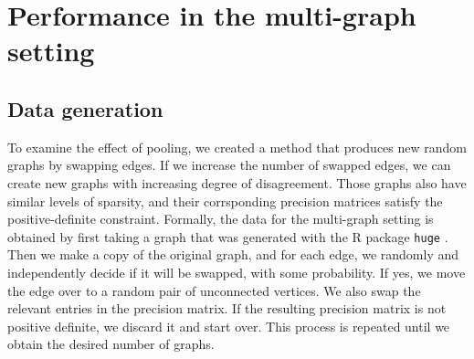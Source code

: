 \documentclass[a4paper, 11pt, oneside]{report}
\newcommand{\1}{\mathds{1}}
\begin{document}
\section{Performance in the multi-graph setting}

\subsection{Data generation}\label{ssect:data-generation}
To examine the effect of pooling, we created a method that produces new random graphs by swapping edges.
If we increase the number of swapped edges, we can create new graphs with increasing degree of disagreement.
Those graphs also have similar levels of sparsity,
and their corrsponding precision matrices satisfy the positive-definite
constraint.
Formally, the data for the multi-graph setting is obtained by first taking a graph
that was generated with the R package \texttt{huge} \citep{huge2020}.
Then we make a copy of the original graph,
and for each edge, we randomly and independently decide if it will be swapped, with some probability.
If yes, we move the edge over to a random pair of unconnected vertices.
We also swap the relevant entries in the precision matrix.
If the resulting precision matrix is not positive definite, we discard it and start over.
This process is repeated until we obtain the desired number of graphs.
\end{document}
